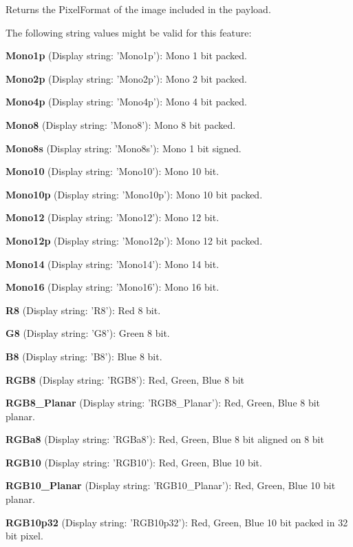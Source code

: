 Returns the Pixel\+Format of the image included in the payload.

The following string values might be valid for this feature\+:
\begin{DoxyItemize}
\item {\bfseries Mono1p} (Display string\+: 'Mono1p')\+: Mono 1 bit packed.
\item {\bfseries Mono2p} (Display string\+: 'Mono2p')\+: Mono 2 bit packed.
\item {\bfseries Mono4p} (Display string\+: 'Mono4p')\+: Mono 4 bit packed.
\item {\bfseries Mono8} (Display string\+: 'Mono8')\+: Mono 8 bit packed.
\item {\bfseries Mono8s} (Display string\+: 'Mono8s')\+: Mono 1 bit signed.
\item {\bfseries Mono10} (Display string\+: 'Mono10')\+: Mono 10 bit.
\item {\bfseries Mono10p} (Display string\+: 'Mono10p')\+: Mono 10 bit packed.
\item {\bfseries Mono12} (Display string\+: 'Mono12')\+: Mono 12 bit.
\item {\bfseries Mono12p} (Display string\+: 'Mono12p')\+: Mono 12 bit packed.
\item {\bfseries Mono14} (Display string\+: 'Mono14')\+: Mono 14 bit.
\item {\bfseries Mono16} (Display string\+: 'Mono16')\+: Mono 16 bit.
\item {\bfseries R8} (Display string\+: 'R8')\+: Red 8 bit.
\item {\bfseries G8} (Display string\+: 'G8')\+: Green 8 bit.
\item {\bfseries B8} (Display string\+: 'B8')\+: Blue 8 bit.
\item {\bfseries R\+G\+B8} (Display string\+: 'R\+G\+B8')\+: Red, Green, Blue 8 bit
\item {\bfseries R\+G\+B8\+\_\+\+Planar} (Display string\+: 'R\+G\+B8\+\_\+\+Planar')\+: Red, Green, Blue 8 bit planar.
\item {\bfseries R\+G\+Ba8} (Display string\+: 'R\+G\+Ba8')\+: Red, Green, Blue 8 bit aligned on 8 bit
\item {\bfseries R\+G\+B10} (Display string\+: 'R\+G\+B10')\+: Red, Green, Blue 10 bit.
\item {\bfseries R\+G\+B10\+\_\+\+Planar} (Display string\+: 'R\+G\+B10\+\_\+\+Planar')\+: Red, Green, Blue 10 bit planar.
\item {\bfseries R\+G\+B10p32} (Display string\+: 'R\+G\+B10p32')\+: Red, Green, Blue 10 bit packed in 32 bit pixel.

\end{DoxyItemize}
